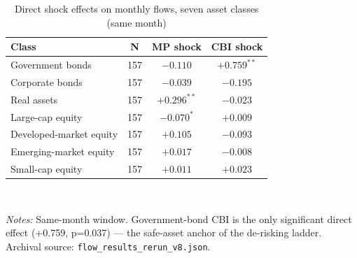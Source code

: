 \begin{table}[!tbp]
\centering\small
\caption{Direct shock effects on monthly flows, seven asset classes (same month)}
\label{tab:a3}
\begin{tabular}{lccc}
\toprule
Class & N & MP shock & CBI shock \\
\midrule
Government bonds & 157 & $-0.110$ & $+0.759^{**}$ \\
Corporate bonds & 157 & $-0.039$ & $-0.195$ \\
Real assets & 157 & $+0.296^{**}$ & $-0.023$ \\
Large-cap equity & 157 & $-0.070^{*}$ & $+0.009$ \\
Developed-market equity & 157 & $+0.105$ & $-0.093$ \\
Emerging-market equity & 157 & $+0.017$ & $-0.008$ \\
Small-cap equity & 157 & $+0.011$ & $+0.023$ \\
\bottomrule
\end{tabular}
\\[2pt]\begin{minipage}{0.92\linewidth}\footnotesize\emph{Notes:} Same-month window. Government-bond CBI is the only significant direct effect (+0.759, p=0.037) — the safe-asset anchor of the de-risking ladder. Archival source: \texttt{flow\_results\_rerun\_v8.json}.\end{minipage}
\end{table}
